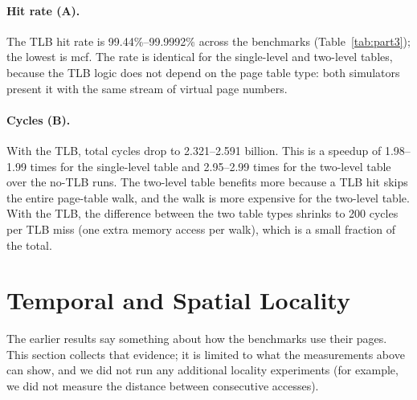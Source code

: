 \documentclass[11pt,a4paper]{article}
\begin{document}
\paragraph{Hit rate (A).} The TLB hit rate is 99.44\%--99.9992\% across the benchmarks (Table~\ref{tab:part3}); the lowest is mcf. The rate is identical for the single-level and two-level tables, because the TLB logic does not depend on the page table type: both simulators present it with the same stream of virtual page numbers.

\paragraph{Cycles (B).} With the TLB, total cycles drop to 2.321--2.591 billion. This is a speedup of 1.98--1.99 times for the single-level table and 2.95--2.99 times for the two-level table over the no-TLB runs. The two-level table benefits more because a TLB hit skips the entire page-table walk, and the walk is more expensive for the two-level table. With the TLB, the difference between the two table types shrinks to 200 cycles per TLB miss (one extra memory access per walk), which is a small fraction of the total.

\section{Temporal and Spatial Locality}

The earlier results say something about how the benchmarks use their pages. This section collects that evidence; it is limited to what the measurements above can show, and we did not run any additional locality experiments (for example, we did not measure the distance between consecutive accesses).
\end{document}
